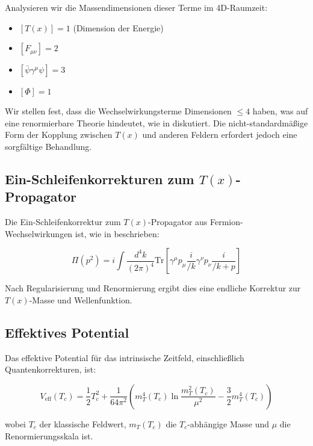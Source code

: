 \documentclass[12pt,a4paper]{article}
\newcommand{\Tfield}{T(x)}
\begin{document}
	Analysieren wir die Massendimensionen dieser Terme im 4D-Raumzeit:
	\begin{itemize}
		\item $[\Tfield] = 1$ (Dimension der Energie)
		\item $[F_{\mu\nu}] = 2$
		\item $[\bar{\psi}\gamma^{\mu}\psi] = 3$
		\item $[\Phi] = 1$
	\end{itemize}
	
	Wir stellen fest, dass die Wechselwirkungsterme Dimensionen $\leq 4$ haben, was auf eine renormierbare Theorie hindeutet, wie in \cite{WeinbergAsymSafety} diskutiert. Die nicht-standardmäßige Form der Kopplung zwischen $\Tfield$ und anderen Feldern erfordert jedoch eine sorgfältige Behandlung.
	
	\subsection{Ein-Schleifenkorrekturen zum $\Tfield$-Propagator}
	\label{sec:schleifenkorrekturen}
	
	Die Ein-Schleifenkorrektur zum $\Tfield$-Propagator aus Fermion-Wechselwirkungen ist, wie in \cite{pascher_feldtheorie_2025} beschrieben:
	
	\begin{equation}
		\Pi(p^2) = i\int \frac{d^4k}{(2\pi)^4} \mathrm{Tr}\left[\gamma^{\mu}p_{\mu}\frac{i}{\slash{k}}\gamma^{\nu}p_{\nu}\frac{i}{\slash{k+p}}\right]
	\end{equation}
	
	Nach Regularisierung und Renormierung ergibt dies eine endliche Korrektur zur $\Tfield$-Masse und Wellenfunktion.
	
	\subsection{Effektives Potential}
	\label{sec:effektives_potential}
	
	Das effektive Potential für das intrinsische Zeitfeld, einschließlich Quantenkorrekturen, ist:
	
	\begin{equation}
		V_{\text{eff}}(T_c) = \frac{1}{2}T_c^2 + \frac{1}{64\pi^2}\left(m_T^4(T_c)\ln\frac{m_T^2(T_c)}{\mu^2} - \frac{3}{2}m_T^4(T_c)\right)
	\end{equation}
	
	wobei $T_c$ der klassische Feldwert, $m_T(T_c)$ die $T_c$-abhängige Masse und $\mu$ die Renormierungsskala ist.
	
\end{document}
